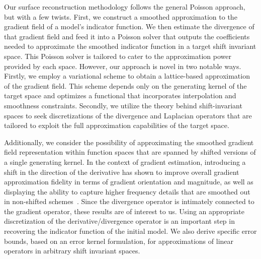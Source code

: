 Our surface reconstruction methodology follows the general Poisson approach, but with a few twists. 
First, we construct a smoothed approximation to the gradient field of a model's indicator function. 
We then estimate the divergence of that gradient field and feed it into a Poisson solver that outputs the coefficients needed to approximate the smoothed indicator function in a target shift invariant space. 
This Poisson solver is tailored to cater to the approximation power provided by each space. 
However, our approach is novel in two notable ways. 
Firstly, we employ a variational scheme to obtain a lattice-based approximation of the gradient field. 
This scheme depends only on the generating kernel of the target space and optimizes a functional that incorporates interpolation and smoothness constraints. 
Secondly, we utilize the theory behind shift-invariant spaces to seek discretizations of the divergence and Laplacian operators that are tailored to exploit the full approximation capabilities of the target space.

Additionally, we consider the possibility of approximating the smoothed gradient field representation within function spaces that are spanned by shifted versions of a single generating kernel. 
In the context of gradient estimation, introducing a shift in the direction of the derivative has shown to improve overall gradient approximation fidelity in terms of gradient orientation and magnitude, as well as displaying the ability to capture higher frequency details that are smoothed out in non-shifted schemes~\cite{gradrev}. 
Since the divergence operator is intimately connected to the gradient operator, these results are of interest to us. Using an appropriate discretization of the derivative/divergence operator is an important step in recovering the indicator function of the initial model. We also derive specific error bounds, based on an error kernel formulation, for approximations of linear operators in arbitrary shift invariant spaces.

